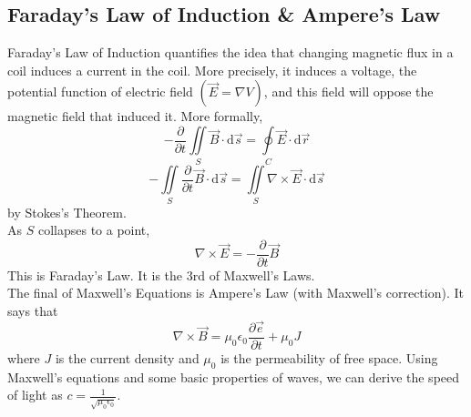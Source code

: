 \subsection{Faraday's Law of Induction \& Ampere's Law}
\noindent
Faraday’s Law of Induction quantifies the idea that changing magnetic flux in a coil induces a current in the coil. More precisely, it induces a voltage, the potential function of electric field $\left(\vec{E} = \nabla V\right)$, and this field will oppose the magnetic field that induced it. More formally,
\begin{equation*}
	-\frac{\partial}{\partial t}\iint\limits_{S}{\vec{B} \cdot \mathrm{d}\vec{s}} = \oint\limits_{C}{\vec{E} \cdot \mathrm{d}\vec{r}}
\end{equation*}
\begin{equation*}
	-\iint\limits_{S}{\frac{\partial}{\partial t}\vec{B} \cdot \mathrm{d}\vec{s}} = \iint\limits_{S}{\nabla \times \vec{E} \cdot \mathrm{d}\vec{s}}
\end{equation*}
by Stokes's Theorem.\\
As $S$ collapses to a point,
\begin{equation*}
	\nabla \times \vec{E} = -\frac{\partial}{\partial t}\vec{B}	
\end{equation*} 
This is Faraday's Law. It is the 3rd of Maxwell's Laws.\\

\noindent
The final of Maxwell's Equations is Ampere's Law (with Maxwell's correction). It says that 
\begin{equation*}
	\nabla \times \vec{B} = \mu_0\epsilon_0\frac{\partial\vec{e}}{\partial t} + \mu_0J	
\end{equation*}
where $J$ is the current density and $\mu_0$ is the permeability of free space. Using Maxwell's equations and some basic properties of waves, we can derive the speed of light as $c = \frac{1}{\sqrt{\mu_0\epsilon_0}}$.